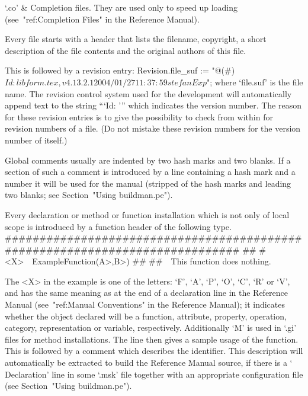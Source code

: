 `.co' &
    Completion files.
    They are used only to speed up loading
    (see~"ref:Completion Files" in the Reference Manual).
\enditems


Every file starts with a header that lists the filename, copyright, a short
description of the file contents and the original authors of this file.

This is followed by a revision entry:
\begintt
Revision.file_suf :=
    "@(#)$Id: libform.tex,v 4.13.2.1 2004/01/27 11:37:59 stefan Exp $";
\endtt
where `file.suf' is the file name. The revision control system used for the
development will automatically append text to the string ``{`Id: '}'' which
indicates the version number. The reason for these revision entries is to
give the possibility to check from within {\GAP} for revision numbers of a
file. (Do not mistake these revision numbers for the version number of
{\GAP} itself.)

Global comments usually are indented by two hash marks and two blanks.
If a section of such a comment is introduced by a line containing
a hash mark and a number it will be used for the manual
(stripped of the hash marks and leading two blanks; see
Section~"Using buildman.pe").

Every declaration or method or function installation which is not only of
local scope is introduced by a function header of the following type.
\)\#\#\#\#\#\#\#\#\#\#\#\#\#\#\#\#\#\#\#\#\#\#\#\#\#\#\#\#\#\#\#\#\#\#\#\#\#\#\#\#\#\#\#\#\#\#\#\#\#\#\#\#\#\#\#\#\#\#\#\#\#\#\#\#\#\#\#\#\#\#\#\#\#\#\#\#\#
\)\#\#
\)\#<X>\ \ ExampleFunction(\<A>,\<B>)
\)\#\#
\)\#\#\ \ This function does nothing.

The <X> in the example is one of the letters: `F', `A', `P', `O',
`C', `R' or `V', and has the same meaning as at the end
of a declaration line in the Reference Manual (see~"ref:Manual Conventions"
in the Reference Manual);
it indicates whether the object declared will be a function, attribute,
property, operation, category, representation or variable, respectively.
Additionally `M' is used in `.gi' files for method installations.
The line then gives a sample usage of the function.
This is followed by a comment which describes the identifier.
This description will automatically be extracted to build the
Reference Manual source, if there is a `\\Declaration' line in some
`.msk' file together with an appropriate configuration file (see
Section~"Using buildman.pe").

